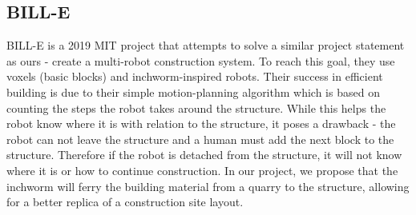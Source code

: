 \subsection{BILL-E}
BILL-E is a 2019 MIT project that attempts to solve a similar project statement as ours - create a multi-robot construction system. To reach this goal, they use voxels (basic blocks) and inchworm-inspired robots. Their success in efficient building is due to their simple motion-planning algorithm which is based on counting the steps the robot takes around the structure. While this helps the robot know where it is with relation to the structure, it poses a drawback - the robot can not leave the structure and a human must add the next block to the structure. Therefore if the robot is detached from the structure, it will not know where it is or how to continue construction. In our project, we propose that the inchworm will ferry the building material from a quarry to the structure, allowing for a better replica of a construction site layout\cite{BillE}.